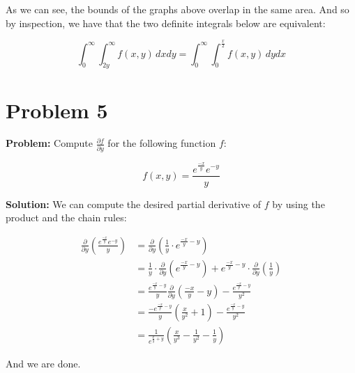 \documentclass{article}
\begin{document}
\begin{center}
{
    }
\end{center}

As we can see, the bounds of the graphs above overlap in the same area. And so by inspection, we have that the two definite integrals below are equivalent:

$$\int_0^\infty\int_{2y}^\infty f(x,y)\,dxdy=\int_0^\infty\int_{0}^{\frac{x}{2}} f(x,y)\,dydx$$

\pagebreak

\section*{Problem 5}
\noindent\textbf{Problem:} Compute $\frac{\partial f}{\partial y}$ for the following function $f$:

$$f(x,y)=\frac{e^{\frac{-x}{y}}e^{-y}}{y}$$

\noindent\textbf{Solution:} We can compute the desired partial derivative of $f$ by using the product and the chain rules:

\begin{align*}
    \frac{\partial}{\partial y}\left(\frac{e^{\frac{-x}{y}}e^{-y}}{y}\right)&=\frac{\partial}{\partial y}\left(\frac{1}{y}\cdot e^{\frac{-x}{y}-y}\right)\\
    &=\frac{1}{y}\cdot\frac{\partial}{\partial y}\left(e^{\frac{-x}{y}-y}\right)+e^{\frac{-x}{y}-y}\cdot\frac{\partial}{\partial y}\left(\frac{1}{y}\right)\\
    &=\frac{e^{\frac{-x}{y}-y}}{y}\frac{\partial}{\partial y}\left(\frac{-x}{y}-y\right)-\frac{e^{\frac{-x}{y}-y}}{y^2}\\
    &=\frac{-e^{\frac{-x}{y}-y}}{y}\left(\frac{x}{y^2}+1\right)-\frac{e^{\frac{-x}{y}-y}}{y^2}\\
    &=\frac{1}{e^{\frac{x}{y}+y}}\left(\frac{x}{y^3}-\frac{1}{y^2}-\frac{1}{y}\right)
\end{align*}

And we are done.
\end{document}
